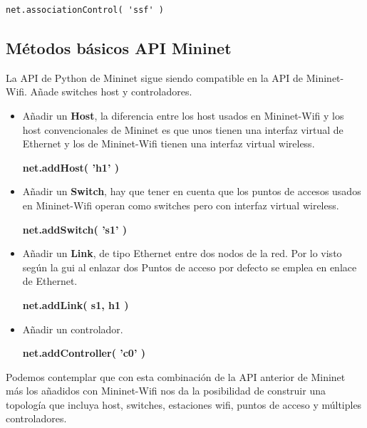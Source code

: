 \begin{verbatim}
net.associationControl( 'ssf' )
\end{verbatim}

\subsection{Métodos básicos API Mininet }

La API de Python de Mininet sigue siendo compatible en la API de Mininet-Wifi. Añade switches host y controladores.\newline
\newline

\begin{itemize}
    \item Añadir un \textbf{Host}, la diferencia entre los host usados en Mininet-Wifi y los host convencionales de Mininet es que unos tienen una interfaz virtual de Ethernet y los de Mininet-Wifi tienen una interfaz virtual wireless.
    \begin{center}
        \textbf{net.addHost( 'h1' )}
    \end{center}
    \item Añadir un \textbf{Switch}, hay que tener en cuenta que los puntos de accesos usados en Mininet-Wifi operan como switches pero con interfaz virtual wireless. 
    \begin{center}
        \textbf{net.addSwitch( 's1' )}
    \end{center}
    \item Añadir un \textbf{Link}, de tipo Ethernet entre dos nodos de la red. Por lo visto según la gui al enlazar dos Puntos de acceso por defecto se emplea en enlace de Ethernet.
    \begin{center}
        \textbf{net.addLink( s1, h1 )}
    \end{center}
    \item  Añadir un controlador.
        \begin{center}
        \textbf{net.addController( 'c0' )}
    \end{center}
\end{itemize}
Podemos contemplar que con esta combinación de la API anterior de Mininet más los añadidos con Mininet-Wifi nos da la posibilidad de construir una topología que incluya host, switches, estaciones wifi, puntos de acceso y múltiples controladores. 
\newpage
